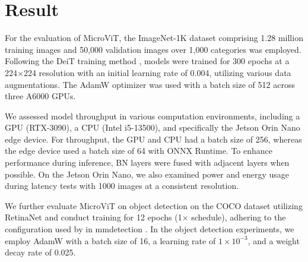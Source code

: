 \section{Result}
For the evaluation of MicroViT, the ImageNet-1K dataset \cite{russakovsky2015imagenet} comprising 1.28 million training images and 50,000 validation images over 1,000 categories was employed. Following the DeiT training method \cite{touvron2021training}, models were trained for 300 epochs at a 224×224 resolution with an initial learning rate of 0.004, utilizing various data augmentations. The AdamW optimizer \cite{loshchilov2017decoupled} was used with a batch size of 512 across three A6000 GPUs.

We assessed model throughput in various computation environments, including a GPU (RTX-3090), a CPU (Intel i5-13500), and specifically the Jetson Orin Nano edge device. For throughput, the GPU and CPU had a batch size of 256, whereas the edge device used a batch size of 64 with ONNX Runtime. To enhance performance during inference, BN layers were fused with adjacent layers when possible. On the Jetson Orin Nano, we also examined power and energy usage during latency tests with 1000 images at a consistent resolution.

We further evaluate MicroViT on object detection on the COCO dataset \cite{lin2014microsoft} utilizing RetinaNet \cite{ross2017focal} and conduct training for 12 epochs (1$\times$ schedule), adhering to the configuration used by \cite{liu2023efficientvit} in mmdetection \cite{mmdetection}. In the object detection experiments, we employ AdamW \cite{loshchilov2017decoupled} with a batch size of 16, a learning rate of $1\times10^{-3}$, and a weight decay rate of 0.025. 


